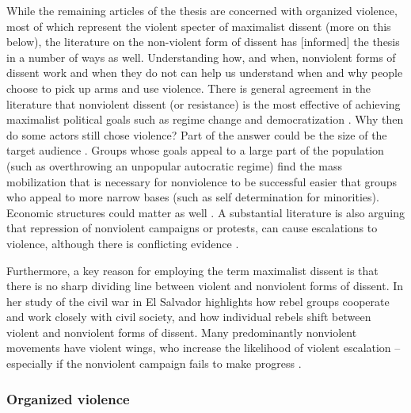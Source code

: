 \documentclass[12pt]{article}
\begin{document}
While the remaining articles of the thesis are concerned with organized
violence, most of which represent the violent specter of maximalist dissent
(more on this below), the literature on the non-violent form of dissent has
[informed] the thesis in a number of ways as well. Understanding how, and when,
nonviolent forms of dissent work and when they do not can help us understand
when and why people choose to pick up arms and use violence. There is general
agreement in the literature that nonviolent dissent (or resistance) is the most
effective of achieving maximalist political goals \citep{chenoweth2011civil,
Stephan_2008} such as regime change and democratization \citep{Celestino_2013,
Bethke_2019}. Why then do some actors still chose violence? Part of the answer
could be the size of the target audience \citep{Gleditsch_2021}. Groups whose
goals appeal to a large part of the population (such as overthrowing an
unpopular autocratic regime) find the mass mobilization that is necessary for
nonviolence to be successful easier that groups who appeal to more narrow bases
(such as self determination for minorities)\citep{Gleditsch_2021}. Economic
structures could matter as well \citep{Butcher_2014}. A substantial literature
is also arguing that repression of nonviolent campaigns or protests, can cause
escalations to violence, although there is conflicting evidence
\citep{Chenoweth_2017, Lichbach_1987}.

Furthermore, a key reason for employing the term maximalist dissent is that
there is no sharp dividing line between violent and nonviolent forms of dissent.
In her study of the civil war in El Salvador \citet{Wood2003} highlights how
rebel groups cooperate and work closely with civil society, and how individual
rebels shift between violent and nonviolent forms of dissent. Many predominantly
nonviolent movements have violent wings, who increase the likelihood of
violent escalation -- especially if the nonviolent campaign fails to make
progress \citep{Ryckman_2019}.

\subsubsection{Organized violence}
\label{Organized violence}
\end{document}
